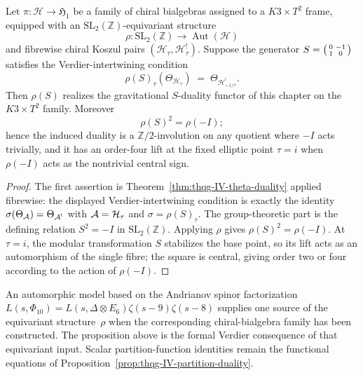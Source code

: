 \begin{proposition}
\label{rem:grav-sdual-1}
Let $\pi\colon\mathcal H\to\mathfrak H_1$ be a family of chiral
bialgebras assigned to a $K3\times T^2$ frame, equipped with an
$\mathrm{SL}_2(\mathbb Z)$-equivariant structure
\[
\rho\colon \mathrm{SL}_2(\mathbb Z)\longrightarrow
\operatorname{Aut}(\mathcal H)
\]
and fibrewise chiral Koszul pairs
$(\mathcal H_\tau,\mathcal H_\tau^!)$. Suppose the generator
$S=\begin{psmallmatrix}0&-1\\1&0\end{psmallmatrix}$ satisfies the
Verdier-intertwining condition
\[
\rho(S)_\tau(\Theta_{\mathcal H_\tau})
\;=\;
\Theta_{\mathcal H^!_{-1/\tau}}.
\]
Then $\rho(S)$ realizes the gravitational $S$-duality functor of this
chapter on the $K3\times T^2$ family. Moreover
\[
\rho(S)^2=\rho(-I);
\]
hence the induced duality is a $\mathbb Z/2$-involution on any quotient
where $-I$ acts trivially, and it has an order-four lift at the fixed
elliptic point $\tau=i$ when $\rho(-I)$ acts as the nontrivial central
sign.
\end{proposition}

\begin{proof}
The first assertion is Theorem~\ref{thm:thqg-IV-theta-duality} applied
fibrewise: the displayed Verdier-intertwining condition is exactly the
identity $\sigma(\Theta_{\mathcal{A}})=\Theta_{\mathcal{A}^!}$ with
$\mathcal{A}=\mathcal H_\tau$ and $\sigma=\rho(S)_\tau$. The group-theoretic
part is the defining relation
$S^2=-I$ in $\mathrm{SL}_2(\mathbb Z)$. Applying $\rho$ gives
$\rho(S)^2=\rho(-I)$. At $\tau=i$, the modular transformation $S$
stabilizes the base point, so its lift acts as an automorphism of the
single fibre; the square is central, giving order two or four according
to the action of $\rho(-I)$.
\end{proof}

\begin{remark}
An automorphic model based on the Andrianov spinor factorization
$L(s,\Phi_{10})=L(s,\Delta\otimes E_6)\zeta(s-9)\zeta(s-8)$ supplies
one source of the equivariant structure~$\rho$ when the corresponding
chiral-bialgebra family has been constructed. The proposition above is
the formal Verdier consequence of that equivariant input. Scalar
partition-function identities remain the functional equations of
Proposition~\ref{prop:thqg-IV-partition-duality}.
\end{remark}
